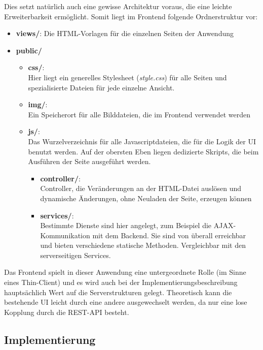 Dies setzt natürlich auch eine gewisse Architektur voraus, die eine leichte Erweiterbarkeit ermöglicht. Somit liegt im Frontend folgende Ordnerstruktur vor:

\begin{itemize}
	\item \textbf{views/}: Die HTML-Vorlagen für die einzelnen Seiten der Anwendung
	\item \textbf{public/}
	\begin{itemize}
		\item \textbf{css/}:\\
		Hier liegt ein generelles Stylesheet (\textit{style.css}) für alle Seiten und spezialisierte Dateien für jede einzelne Ansicht.
		\item \textbf{img/}:\\
		Ein Speicherort für alle Bilddateien, die im Frontend verwendet werden
		\item \textbf{js/}:\\
		Das Wurzelverzeichnis für alle Javascriptdateien, die für die Logik der \ac{UI} benutzt werden. Auf der obersten Eben liegen dedizierte Skripts, die beim Ausführen der Seite ausgeführt werden.
		\begin{itemize}
			\item \textbf{controller/}:\\
			Controller, die Veränderungen an der HTML-Datei auslösen und dynamische Änderungen, ohne Neuladen der Seite, erzeugen können 
			\item \textbf{services/}:\\
			Bestimmte Dienste sind hier angelegt, zum Beispiel die \gls{AJAX}-Kommunikation mit dem Backend. Sie sind von überall erreichbar und bieten verschiedene statische Methoden. Vergleichbar mit den serverseitigen Services.
		\end{itemize}
	\end{itemize}
\end{itemize}

Das Frontend spielt in dieser Anwendung eine untergeordnete Rolle (im Sinne eines Thin-Client) und es wird auch bei der Implementierungsbeschreibung hauptsächlich Wert auf die Serverstrukturen gelegt. Theoretisch kann die bestehende \ac{UI} leicht durch eine andere ausgewechselt werden, da nur eine lose Kopplung durch die \gls{REST}-API besteht.

\subsection{Implementierung}\label{subsec:implementation}

